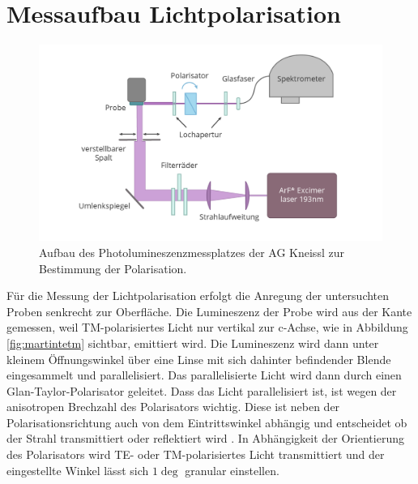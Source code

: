 \section{Messaufbau Lichtpolarisation}
\begin{figure}[!htb]
    \centering
    \begin{minipage}[t]{\linewidth}
        \centering
        \includegraphics[width=0.8\linewidth]{Bilder/aufbauPol.png}
        \caption{Aufbau des Photolumineszenzmessplatzes der AG Kneissl zur Bestimmung der Polarisation. }
        \label{fig:wurtz}
    \end{minipage}%
\end{figure}
\vspace{1cm}
\noindent
Für die Messung der Lichtpolarisation erfolgt die Anregung der untersuchten Proben senkrecht zur Oberfläche. Die Lumineszenz der Probe wird aus der Kante gemessen, weil TM-polarisiertes Licht nur vertikal zur c-Achse, wie in Abbildung \ref{fig:martintetm} sichtbar, emittiert wird. Die Lumineszenz wird dann unter kleinem Öffnungswinkel über eine Linse mit sich dahinter befindender Blende eingesammelt und parallelisiert. Das parallelisierte Licht wird dann durch einen Glan-Taylor-Polarisator geleitet. Dass das Licht parallelisiert ist, ist wegen der anisotropen Brechzahl des Polarisators wichtig. Diese ist neben der Polarisationsrichtung auch von dem Eintrittswinkel abhängig und entscheidet ob der Strahl transmittiert oder reflektiert wird \cite{0950-7671-25-12-304}. In Abhängigkeit der Orientierung des Polarisators wird TE- oder TM-polarisiertes Licht transmittiert und der eingestellte Winkel lässt sich $1\deg$ granular einstellen. 
